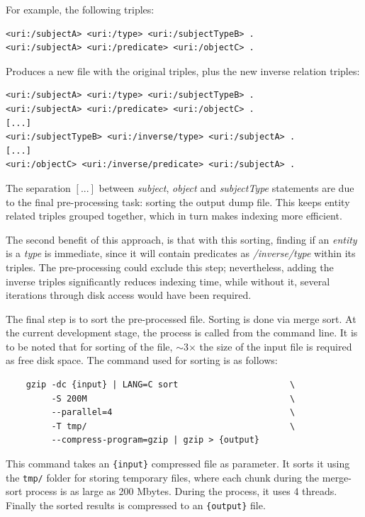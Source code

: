 \begin{example}
For example, the following triples:

\begin{verbatim}
<uri:/subjectA> <uri:/type> <uri:/subjectTypeB> .
<uri:/subjectA> <uri:/predicate> <uri:/objectC> .
\end{verbatim}

Produces a new file with the original triples, plus the new inverse relation triples:

\begin{verbatim}
<uri:/subjectA> <uri:/type> <uri:/subjectTypeB> .
<uri:/subjectA> <uri:/predicate> <uri:/objectC> .
[...]
<uri:/subjectTypeB> <uri:/inverse/type> <uri:/subjectA> .
[...]
<uri:/objectC> <uri:/inverse/predicate> <uri:/subjectA> .
\end{verbatim}

The separation $[...]$ between \textit{subject}, \textit{object} and \textit{subjectType} statements are due to the final pre-processing task: sorting the output dump file. 
This keeps entity related triples grouped together, which in turn makes indexing more efficient.

\end{example}

The second benefit of this approach, is that with this sorting, finding if an \textit{entity} is a \textit{type} is immediate, since it will contain predicates as \textit{/inverse/type} within its triples. 
The pre-processing could exclude this step; nevertheless, adding the inverse triples significantly reduces indexing time, while without it, several iterations through disk access would have been required. 

The final step is to sort the pre-processed file. Sorting is done via merge sort. At the current development stage, the process is called from the command line. It is to be noted that for sorting of the file, $\sim$3$\times$ the size of the input file is required as free disk space. The command used for sorting is as follows: 

\begin{verbatim}
    gzip -dc {input} | LANG=C sort                      \
         -S 200M                                        \
         --parallel=4                                   \
         -T tmp/                                        \
         --compress-program=gzip | gzip > {output}
\end{verbatim}

This command takes an \texttt{\{input\}} compressed file as parameter. It sorts it using the \texttt{tmp/} folder for storing temporary files, where each chunk during the merge-sort process is as large as 200 Mbytes. During the process, it uses 4 threads. Finally the sorted results is compressed to an \texttt{\{output\}} file.

